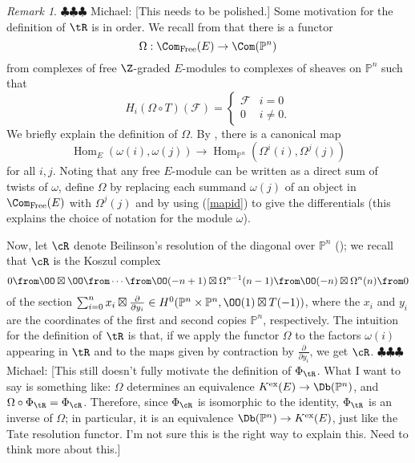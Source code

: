 \documentclass[12pt]{amsart}
\theoremstyle{definition}
\theoremstyle{remark}
\newtheorem{rem}[lemma]{Remark}
\newcommand{\PP}{\mathbb P}
\newcommand{\Hom}{\operatorname{Hom}} %
\newcommand{\F}{\FF}
\newcommand{\michael}[1]{{\color{red} \sf $\clubsuit\clubsuit\clubsuit$ Michael: [#1]}}
\def\on{\operatorname}
\def\om{\omega}
\def\F{\mathcal{F}}
\def\om{\omega}
\begin{document}
\begin{rem} \michael{This needs to be polished.}
Some motivation for the definition of $\tR$ is in order. We recall from \cite[Section 6]{EFS} that there is a functor
\begin{equation}
\label{geobgg}
\Omega: \Com_{\on{Free}}(E) \to \Com(\PP^n)
\end{equation}
from complexes of free $\Z$-graded $E$-modules to complexes of sheaves on $\PP^n$ such that
$$
H_i(\Omega \circ T)(\F) = \begin{cases} \F & i = 0 \\ 0 & i \ne 0. \end{cases}
$$
We briefly explain the definition of $\Omega$. By \cite[Proposition 5.6]{EFS}, there is a canonical map
\begin{equation}
\label{mapid}
\Hom_E(\om(i), \om(j)) \to \Hom_{\PP^n}(\Omega^i(i), \Omega^j(j))
\end{equation}
for all $i, j$. Noting that any free $E$-module can be written as a direct sum of twists of $\om$, define $\Omega$ by 
replacing each summand $\om(j)$ of an object in $\Com_{\on{Free}}(E)$ with $\Omega^j(j)$ and by using (\ref{mapid}) to give the differentials (this explains the choice of notation for the module $\om$). 

Now, let $\cR$ denote Beilinson's resolution of the diagonal over $\PP^n$ (\cite{beilinson}); we recall that $\cR$ is the Koszul complex
$$
0 \from \OO \boxtimes \OO \from \cdots \from \OO(-n + 1) \boxtimes \Omega^{n-1}(n-1) \from \OO(-n) \boxtimes \Omega^n(n) \from 0
$$
of the section $\sum_{i = 0}^n x_i \boxtimes \frac{\partial}{\partial y_i} \in H^0(\PP^n \times \PP^n, \OO(1) \boxtimes T(-1))$, where the $x_i$ and $y_i$ are the coordinates of the first and second copies $\PP^n$, respectively. The intuition for the definition of $\tR$ is that, if we apply the functor $\Omega$ to the factors $\om(i)$ appearing in $\tR$ and to the maps given by contraction by $\frac{\partial}{\partial y_i}$, we get $\cR$. \michael{This still doesn't fully motivate the definition of $\Phi_{\tR}$. What I want to say is something like: $\Omega$ determines an equivalence $K^{\on{ex}}(E) \to \Db(\PP^n)$, and $\Omega \circ \Phi_{\tR} = \Phi_{\cR}$. Therefore, since $\Phi_{\cR}$ is isomorphic to the identity, $\Phi_{\tR}$ is an inverse of $\Omega$; in particular, it is an equivalence $\Db(\PP^n) \to K^{\on{ex}}(E)$, just like the Tate resolution functor. I'm not sure this is the right way to explain this. Need to think more about this.}
\end{rem}
 
\end{document}
